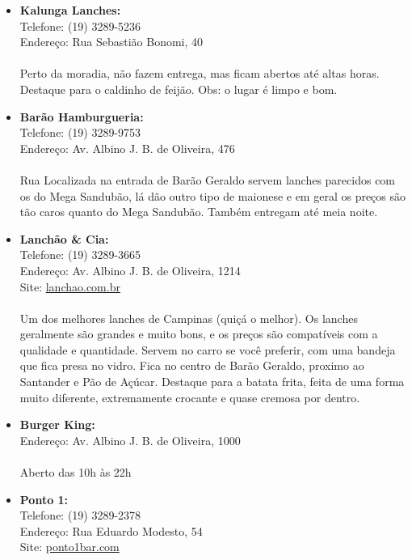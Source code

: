 \begin{itemize}
    \item   \textbf{Kalunga Lanches:}
        \\Telefone: (19) 3289-5236
        \\Endereço: Rua Sebastião Bonomi, 40
        \\\\
        Perto da moradia, não fazem entrega, mas ficam abertos até altas horas.
        Destaque para o caldinho de feijão. Obs: o lugar é limpo e bom.

    \item   \textbf{Barão Hamburgueria:}
        \\Telefone: (19) 3289-9753
        \\Endereço: Av. Albino J. B. de Oliveira, 476
        \\\\
        Rua Localizada na entrada de Barão Geraldo servem lanches parecidos com
        os do Mega Sandubão, lá dão outro tipo de maionese e em geral os preços
        são tão caros quanto do Mega Sandubão. Também entregam até meia noite.

    \item   \textbf{Lanchão \& Cia:}
        \\Telefone: (19) 3289-3665
        \\Endereço: Av. Albino J. B. de Oliveira, 1214
        \\Site: \url{lanchao.com.br}
        \\\\
        Um dos melhores lanches de Campinas (quiçá o melhor). Os lanches
        geralmente são grandes e muito bons, e os preços são compatíveis com a
        qualidade e quantidade. Servem no carro se você preferir, com uma
        bandeja que fica presa no vidro. Fica no centro de Barão Geraldo,
        proximo ao Santander e Pão de Açúcar. Destaque para a batata frita,
        feita de uma forma muito diferente, extremamente crocante e quase
        cremosa por dentro.

    \item   \textbf{Burger King:}
        \\Endereço: Av. Albino J. B. de Oliveira, 1000
        \\\\
        Aberto das 10h às 22h

    \item   \textbf{Ponto 1:}
        \\Telefone: (19) 3289-2378
        \\Endereço: Rua Eduardo Modesto, 54
        \\Site: \url{ponto1bar.com}


\end{itemize}
